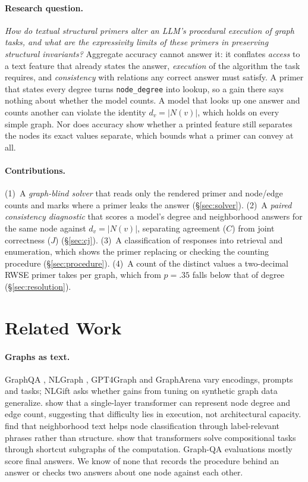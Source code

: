 \documentclass[11pt]{article}
\newcommand{\task}[1]{\texttt{#1}}
\begin{document}
\paragraph{Research question.} \emph{How do textual structural primers alter
an LLM's procedural execution of graph tasks, and what are the expressivity
limits of these primers in preserving structural invariants?} Aggregate
accuracy cannot answer it: it conflates \emph{access} to a
text feature that already states the answer, \emph{execution} of the
algorithm the task requires, and \emph{consistency} with relations any
correct answer must satisfy. A primer that states every degree turns
\task{node\_degree} into lookup, so a gain there says nothing about whether
the model counts. A model that looks up one answer and counts another can
violate the identity $d_v{=}|N(v)|$, which holds on every simple graph. Nor
does accuracy show whether a printed feature still separates the nodes its
exact values separate, which bounds what a primer can convey at all.

\paragraph{Contributions.} (1)~A \emph{graph-blind solver} that reads only the
rendered primer and node/edge counts and marks where a primer leaks the answer
(\S\ref{sec:solver}). (2)~A \emph{paired consistency diagnostic} that scores
a model's degree and neighborhood answers for the same node against
$d_v{=}|N(v)|$, separating agreement ($C$) from joint correctness ($J$)
(\S\ref{sec:cj}). (3)~A classification of responses into retrieval and
enumeration, which shows the primer replacing or checking the counting
procedure (\S\ref{sec:procedure}). (4)~A count of the distinct values a
two-decimal RWSE primer takes per graph, which from $p{=}.35$ falls below
that of degree (\S\ref{sec:resolution}).

\section{Related Work}

\paragraph{Graphs as text.} GraphQA \citep{fatemi2023talklikeagraph}, NLGraph
\citep{wang2023nlgraph}, GPT4Graph \citep{guo2023gpt4graph} and GraphArena
\citep{tang2025grapharena} vary encodings, prompts and tasks; NLGift
\citep{zhang2024nlgift} asks whether gains from tuning on synthetic graph
data generalize. \citet{sanford2024understanding} show that a single-layer
transformer can represent node degree and edge count, suggesting that
difficulty lies in execution, not architectural capacity.
\citet{huang2024can} find that neighborhood text helps node classification
through label-relevant phrases rather than structure.
\citet{dziri2023faithandfate} show that transformers solve compositional
tasks through shortcut subgraphs of the computation. Graph-QA evaluations
mostly score final answers. We know of none that records the procedure
behind an answer or checks two answers about one node against each other.
\end{document}

